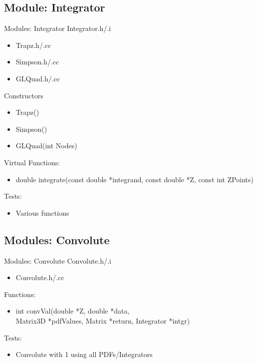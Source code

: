 \documentclass{beamer}
\begin{document}
\subsection{Module: Integrator}
\begin{frame}{Modules: Integrator}
Integrator.h/.i
\begin{itemize}
\item Trapz.h/.cc
\item Simpson.h/.cc
\item GLQuad.h/.cc
\end{itemize}

Constructors
\begin{itemize}
\item Trapz()
\item Simpson()
\item GLQuad(int Nodes)
\end{itemize}

Virtual Functions:
\begin{itemize}
\item double integrate(const double *integrand, const double *Z, const int ZPoints)
\end{itemize}

Tests:
\begin{itemize}
\item Various functions
\end{itemize}
\end{frame}

\subsection{Modules: Convolute}
\begin{frame}{Modules: Convolute}
Convolute.h/.i
\begin{itemize}
\item Convolute.h/.cc
\end{itemize}

Functions:
\begin{itemize}
\item int convVal(double *Z, double *data, \\Matrix3D *pdfValues, Matrix *return, Integrator *intgr)
\end{itemize}

Tests:
\begin{itemize}
\item Convolute with 1 using all PDFs/Integrators
\end{itemize}
\end{frame}
\end{document}
